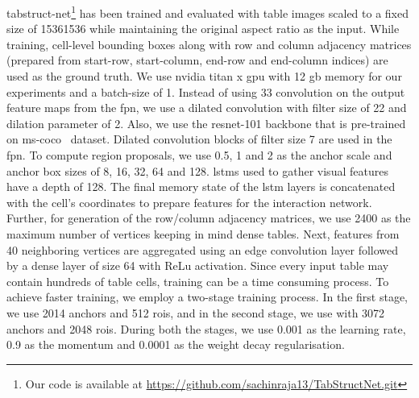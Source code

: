 \documentclass[runningheads]{llncs}
\begin{document}
{\sc t}ab{\sc s}truct-{\sc n}et\footnote{Our code is available at \url{ https://github.com/sachinraja13/TabStructNet.git}} has been trained and evaluated with table images scaled to a fixed size of 15361536 while maintaining the original aspect ratio as the input. While training, cell-level bounding boxes along with row and column adjacency matrices (prepared from start-row, start-column, end-row and end-column indices) are used as the ground truth. We use {\sc nvidia titan x gpu} with 12 {\sc gb} memory for our experiments and a batch-size of 1. Instead of using 33 convolution on the output feature maps from the {\sc fpn}, we use a dilated convolution with filter size of 22 and dilation parameter of 2. Also, we use the {\sc r}es{\sc n}et-101 backbone that is pre-trained on {\sc ms-coco}~\cite{ms_coco} dataset. Dilated convolution blocks of filter size 7 are used in the {\sc fpn}. To compute region proposals, we use 0.5, 1 and 2 as the anchor scale and anchor box sizes of 8, 16, 32, 64 and 128. {\sc lstm}s used to gather visual features have a depth of 128. The final memory state of the {\sc lstm} layers is concatenated with the cell's coordinates to prepare features for the interaction network.  Further, for generation of the row/column adjacency matrices, we use 2400 as the maximum number of vertices keeping in mind dense tables. Next, features from 40 neighboring vertices are aggregated using an edge convolution layer followed by a dense layer of size 64 with ReLu activation. Since every input table may contain hundreds of table cells, training can be a time consuming process. To achieve faster training, we employ a two-stage training process. In the first stage, we use 2014 anchors and 512 {\sc r}o{\sc i}s, and in the second stage, we use with 3072 anchors and 2048 {\sc r}o{\sc i}s. During both the stages, we use 0.001 as the learning rate, 0.9 as the momentum and 0.0001 as the weight decay regularisation.
\end{document}
